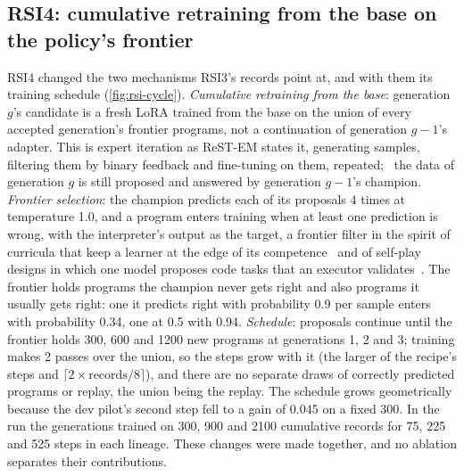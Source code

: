 \subsection{RSI4: cumulative retraining from the base on the policy's frontier}\label{sec:rsi4}

RSI4 changed the two mechanisms RSI3's records point at, and with them its training schedule
(\cref{fig:rsi-cycle}).
\emph{Cumulative retraining from the base}: generation $g$'s candidate is a fresh LoRA trained from
the base on the union of every accepted generation's frontier programs, not a continuation of
generation $g-1$'s adapter. This is expert iteration as ReST-EM states it, generating samples,
filtering them by binary feedback and fine-tuning on them, repeated;~\citep{restem2023} the data of generation $g$ is still proposed and answered
by generation $g-1$'s champion. \emph{Frontier selection}: the champion predicts each of its proposals
4 times at temperature 1.0, and a program enters training when at least one prediction is wrong, with
the interpreter's output as the target, a frontier filter in the spirit of curricula that keep a
learner at the edge of its competence~\citep{sec2025} and of self-play designs in which one model
proposes code tasks that an executor validates~\citep{absolutezero2025}. The frontier holds
programs the champion never gets right and also programs it usually gets right: one it predicts right
with probability 0.9 per sample enters with probability 0.34, one at 0.5 with 0.94. \emph{Schedule}: proposals continue
until the frontier holds 300, 600 and 1200 new programs at generations 1, 2 and 3; training makes 2
passes over the union, so the steps grow with it (the larger of the recipe's steps and
$\lceil 2\times\text{records}/8\rceil$), and there are no separate draws of correctly predicted
programs or replay, the union being the replay. The schedule grows geometrically because the
dev pilot's second step fell to a gain of 0.045 on a fixed 300. In the run the generations
trained on 300, 900 and 2100 cumulative records for 75, 225 and 525 steps in each lineage.
These changes were made together, and no ablation separates their contributions.


